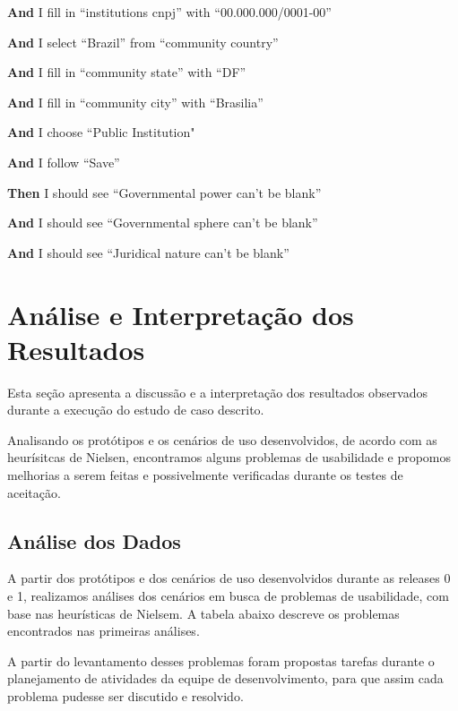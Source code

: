     \textbf{And }I fill in ``institutions cnpj'' with ``00.000.000/0001-00''

    \textbf{And }I select ``Brazil'' from ``community country''

    \textbf{And }I fill in ``community state'' with ``DF''

    \textbf{And }I fill in ``community city'' with ``Brasilia''

    \textbf{And }I choose ``Public Institution"

    \textbf{And }I follow ``Save''

    \textbf{Then} I should see ``Governmental power can't be blank''

    \textbf{And }I should see ``Governmental sphere can't be blank''

    \textbf{And }I should see ``Juridical nature can't be blank''


  


\section{Análise e Interpretação dos Resultados}

Esta seção apresenta a discussão e a interpretação dos resultados observados durante a execução do estudo de caso descrito.

Analisando os protótipos e os cenários de uso desenvolvidos, de acordo com as heurísitcas de Nielsen, encontramos alguns problemas de usabilidade e propomos melhorias a serem feitas e possivelmente verificadas durante os testes de aceitação.

\subsection{Análise dos Dados}

A partir dos protótipos e dos cenários de uso desenvolvidos durante as releases 0 e 1, realizamos análises dos cenários em busca de problemas de usabilidade, com base nas heurísticas de Nielsem. A tabela abaixo descreve os problemas encontrados nas primeiras análises.

A partir do levantamento desses problemas foram propostas tarefas durante o planejamento de atividades da equipe de desenvolvimento, para que assim cada problema pudesse ser discutido e resolvido.



